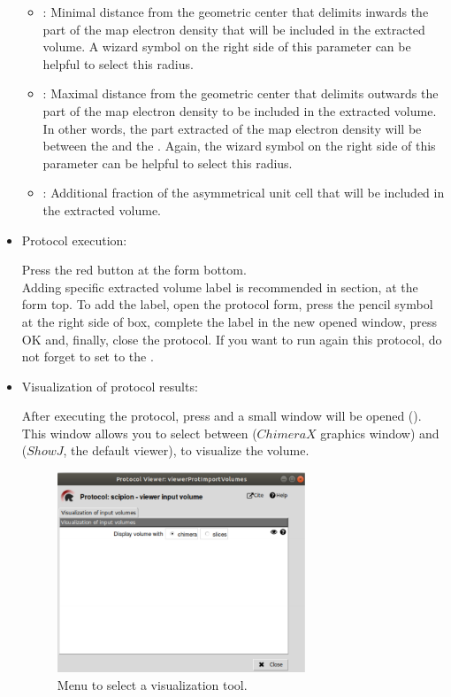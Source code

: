 \begin{itemize}
\begin{itemize}
  \item {}: Minimal distance from the geometric center that delimits inwards the part of the map electron density that will be included in the extracted volume. A wizard symbol on the right side of this parameter can be helpful to select this radius.
  \item {}: Maximal distance from the geometric center that delimits outwards the part of the map electron density to be included in the extracted volume. In other words, the part extracted of the map electron density will be between the  and the . Again, the wizard symbol on the right side of this parameter can be helpful to select this radius.  
  \item {}: Additional fraction of the asymmetrical unit cell that will be included in the extracted volume.
  \end{itemize}

  \item Protocol execution:
  
  Press the  red button at the form bottom.\\
  Adding specific extracted volume label is recommended in  section, at the form top. To add the label, open the protocol form, press the pencil symbol at the right side of  box, complete the label in the new opened window, press OK and, finally, close the protocol. If you want to run again this protocol, do not forget to set to  the .
  
  \item Visualization of protocol results:
  
  After executing the protocol, press  and a small window will be opened (). This window allows you to select between  ($ChimeraX$ graphics window) and  ($ShowJ$, the default \scipion viewer), to visualize the volume.
  
    \begin{figure}[H]
    \centering 
    \captionsetup{width=.7\linewidth} 
    \includegraphics[width=0.70\textwidth]{Images_appendix/Fig101.pdf}
    \caption{Menu to select a visualization tool.}
    \label{fig:app_protocol_volume_2}
   \end{figure}
   

\end{itemize}
